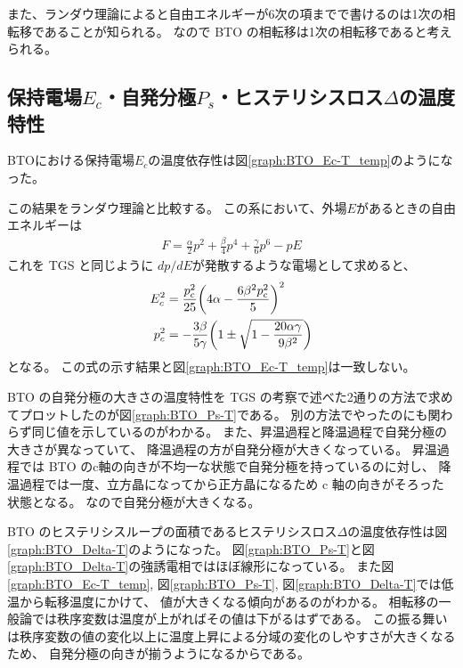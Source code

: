 \documentclass[9pt,dvipdfmx,a4paper]{jsarticle}
\begin{document}
また、ランダウ理論によると自由エネルギーが6次の項までで書けるのは1次の相転移であることが知られる。
なので BTO の相転移は1次の相転移であると考えられる。

\subsection{保持電場\(E_c\)・自発分極\(P_s\)・ヒステリシスロス\(\Delta\)の温度特性}
BTOにおける保持電場\(E_c\)の温度依存性は図\ref{graph:BTO_Ec-T_temp}のようになった。

この結果をランダウ理論と比較する。
この系において、外場\(E\)があるときの自由エネルギーは
\begin{align}
    F = \frac{\alpha}{2} p^2 + \frac{\beta}{4} p^4 +\frac{\gamma}{6} p^6-pE
\end{align}
これを TGS と同じように \(dp/dE\)が発散するような電場として求めると、
\begin{align}
    E_c^2 &= \frac{p_c^2}{25}\qty(4\alpha-\frac{6\beta^2p_c^2}{5})^2\\
    p_c^2 &= -\frac{3\beta}{5\gamma}\qty(1\pm\sqrt{1-\frac{20\alpha\gamma}{9\beta^2}} )
\end{align}
となる。
この式の示す結果と図\ref{graph:BTO_Ec-T_temp}は一致しない。

BTO の自発分極の大きさの温度特性を TGS の考察で述べた2通りの方法で求めてプロットしたのが図\ref{graph:BTO_Ps-T}である。
別の方法でやったのにも関わらず同じ値を示しているのがわかる。
また、昇温過程と降温過程で自発分極の大きさが異なっていて、
降温過程の方が自発分極が大きくなっている。
昇温過程では BTO のc軸の向きが不均一な状態で自発分極を持っているのに対し、
降温過程では一度、立方晶になってから正方晶になるため c 軸の向きがそろった状態となる。
なので自発分極が大きくなる。

BTO のヒステリシスループの面積であるヒステリシスロス\(\Delta\)の温度依存性は図\ref{graph:BTO_Delta-T}のようになった。
図\ref{graph:BTO_Ps-T}と図\ref{graph:BTO_Delta-T}の強誘電相ではほぼ線形になっている。
また図\ref{graph:BTO_Ec-T_temp}, 図\ref{graph:BTO_Ps-T}, 図\ref{graph:BTO_Delta-T}では低温から転移温度にかけて、
値が大きくなる傾向があるのがわかる。
相転移の一般論では秩序変数は温度が上がればその値は下がるはずである。
この振る舞いは秩序変数の値の変化以上に温度上昇による分域の変化のしやすさが大きくなるため、
自発分極の向きが揃うようになるからである。
\end{document}

